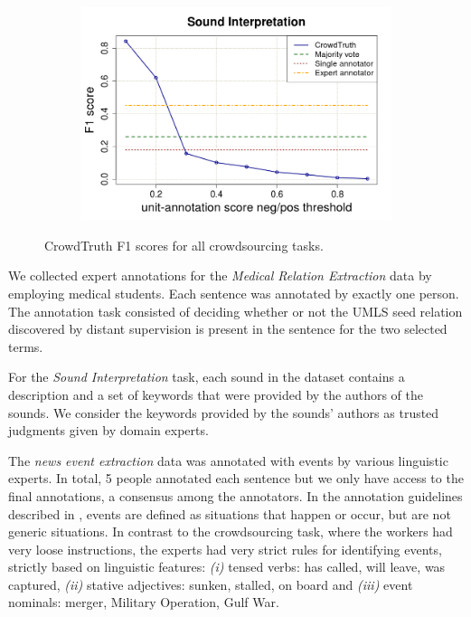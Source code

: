 \begin{figure}[!b]
\begin{subfigure}{.5\textwidth}
\end{subfigure}%
\begin{subfigure}{.5\textwidth}
\includegraphics[width=\linewidth]{img/sounds_mv_2.png}
\end{subfigure}
\caption{CrowdTruth F1 scores for all crowdsourcing tasks.}
\label{fig:f1_mv}
\end{figure}

We collected expert annotations for the \textit{Medical Relation Extraction} data by employing medical students. Each sentence was annotated by exactly one person. The annotation task consisted of deciding whether or not the UMLS seed relation discovered by distant supervision is present in the sentence for the two selected terms.

For the \textit{Sound Interpretation} task, each sound in the dataset contains a description and a set of keywords that were provided by the authors of the sounds. We consider the keywords provided by the sounds' authors as trusted judgments given by domain experts.

The \emph{news event extraction} data was annotated with events by various linguistic experts. In total, 5 people annotated each sentence but we only have access to the final annotations, a consensus among the annotators. In the annotation guidelines described in \cite{pustejovsky2003timebank}, events are defined as situations that happen or occur, but are not generic situations. In contrast to the crowdsourcing task, where the workers had very loose instructions, the experts had very strict rules for identifying events, strictly based on linguistic features: \emph{(i)} tensed verbs: has called, will leave, was captured, \emph{(ii)} stative adjectives: sunken, stalled, on board and \emph{(iii)} event nominals: merger, Military Operation, Gulf War.

